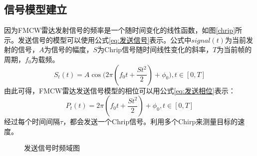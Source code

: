 \subsection{信号模型建立} \label{信号模型建立}
因为FMCW雷达发射信号的频率是一个随时间变化的线性函数，如图\ref{chrip}所示。发送信号的模型\cite{DBLP:journals/tcas/GerstmairMOSH18}可以使用公式\eqref{eq:发送信号}表示。公式中$signal(t)$为当前发射的信号，$A$为信号的幅度，$S$为Chrip信号随时间线性变化的斜率，$T$为当前帧的周期，$f_0$为载频。
\begin{equation}
	\label{eq:发送信号}
	S_t(t) = A \cos\big(2\pi (f_0t+\frac{St^2}{2}) + \phi_0 \big), t \in [0,T]
\end{equation}
由此可得，FMCW雷达发送信号模型的相位可以用公式\eqref{eq:发送相位}表示：
\begin{equation}
	\label{eq:发送相位}
	P_t(t) = 2\pi (f_0t+\frac{St^2}{2})+ \phi_0, t \in [0,T]
\end{equation}
经过每个时间间隔$\tau$，都会发送一个Chrip信号。利用多个Chirp来测量目标的速度。

\begin{figure}[htbp]
	\centering
	\caption{发送信号时频域图}
	\label{fig:发送信号时频域图}
\end{figure}

